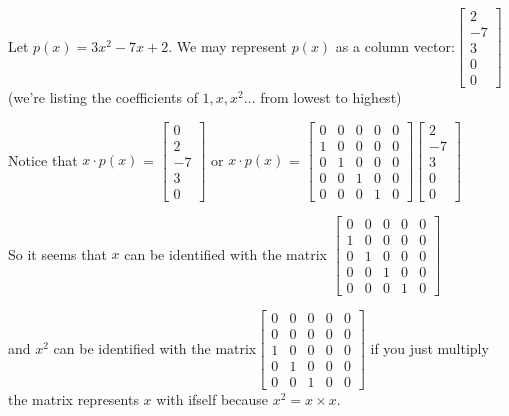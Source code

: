 \begin{example}{}
Let $p(x) = 3x^2 - 7x + 2$.  We may represent $p(x)$  as a column vector:$\left[\begin{array}{c}2\\-7\\3\\0\\0\end{array}\right]$
(we're listing the coefficients of $1,x,x^2 \ldots$ from lowest to highest)

Notice that $x \cdot p(x)$ = $\left[\begin{array}{c}0\\2\\-7\\3\\0\end{array}\right]$
or $x \cdot p(x)$ = $\left[\begin{array}{ccccc}0 & 0 & 0 & 0 & 0\\1 & 0 & 0 & 0 & 0\\0 & 1 & 0 & 0 & 0\\0 & 0 & 1 & 0 & 0\\0 & 0 & 0 & 1 & 0\end{array}\right]$$\left[\begin{array}{c}2\\-7\\3\\0\\0\end{array}\right]$

So it seems that $x$ can be identified with the matrix $\left[\begin{array}{ccccc}0 & 0 & 0 & 0 & 0\\1 & 0 & 0 & 0 & 0\\0 & 1 & 0 & 0 & 0\\0 & 0 & 1 & 0 & 0\\0 & 0 & 0 & 1 & 0\end{array}\right]$

and $x^2$ can be identified with the matrix$\left[\begin{array}{ccccc}0 & 0 & 0 & 0 & 0\\0 & 0 & 0 & 0 & 0\\1 & 0 & 0 & 0 & 0\\0 & 1 & 0 & 0 & 0\\0 & 0 & 1 & 0 & 0\end{array}\right]$ if you just multiply the matrix represents $x$ with ifself because $x^2=x\times x$.
\end{example}

